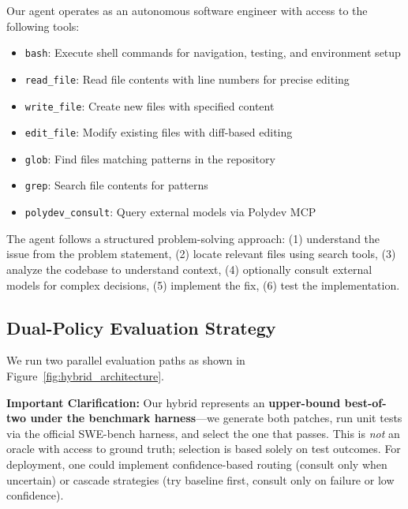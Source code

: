 \documentclass[11pt,a4paper]{article}
\begin{document}
Our agent operates as an autonomous software engineer with access to the following tools:
\begin{itemize}
    \item \texttt{bash}: Execute shell commands for navigation, testing, and environment setup
    \item \texttt{read\_file}: Read file contents with line numbers for precise editing
    \item \texttt{write\_file}: Create new files with specified content
    \item \texttt{edit\_file}: Modify existing files with diff-based editing
    \item \texttt{glob}: Find files matching patterns in the repository
    \item \texttt{grep}: Search file contents for patterns
    \item \texttt{polydev\_consult}: Query external models via Polydev MCP
\end{itemize}

The agent follows a structured problem-solving approach: (1) understand the issue from the problem statement, (2) locate relevant files using search tools, (3) analyze the codebase to understand context, (4) optionally consult external models for complex decisions, (5) implement the fix, (6) test the implementation.

\subsection{Dual-Policy Evaluation Strategy}

We run two parallel evaluation paths as shown in Figure~\ref{fig:hybrid_architecture}. 

\textbf{Important Clarification:} Our hybrid represents an \textbf{upper-bound best-of-two under the benchmark harness}---we generate both patches, run unit tests via the official SWE-bench harness, and select the one that passes. This is \textit{not} an oracle with access to ground truth; selection is based solely on test outcomes. For deployment, one could implement confidence-based routing (consult only when uncertain) or cascade strategies (try baseline first, consult only on failure or low confidence).
\end{document}
